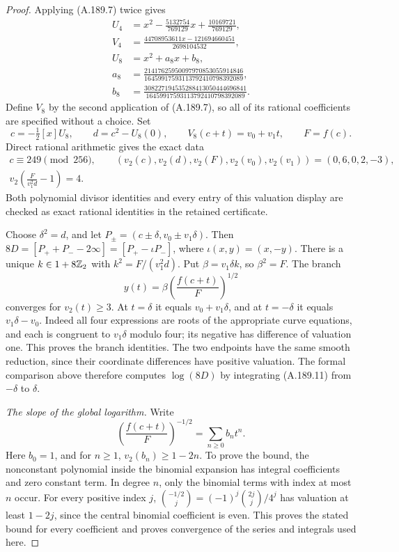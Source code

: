 \begin{proof}
Applying (A.189.7) twice gives
\[
\begin{aligned}
 U_4&=x^2-\frac{5132754}{769129}x
                         +\frac{10169721}{769129},\\
 V_4&=\frac{44708953611x-121694660451}{2698104532},\\
 U_8&=x^2+a_8x+b_8,\\
 a_8&=\frac{21417625950097970853055914846}{16459917593113792410798392089},\\
 b_8&=\frac{308227194535288413050444696841}{16459917593113792410798392089}.
\end{aligned}
\tag{A.189.8}
\]
Define \(V_8\) by the second application of
(A.189.7), so all of its rational coefficients are
specified without a choice.  Set
\[
 c=-\tfrac12[x]U_8,\qquad d=c^2-U_8(0),\qquad
 V_8(c+t)=v_0+v_1t,\qquad F=f(c).
\tag{A.189.9}
\]
Direct rational arithmetic gives the exact data
\[
\begin{gathered}
 c\equiv249\pmod{256},\qquad
 (v_2(c),v_2(d),v_2(F),v_2(v_0),v_2(v_1))
                         =(0,6,0,2,-3),\\
 v_2\!\left(\frac{F}{v_1^2d}-1\right)=4.
\end{gathered}
\tag{A.189.10}
\]
Both polynomial divisor identities and every entry of
this valuation display are checked as exact rational
identities in the retained certificate.

Choose \(\delta^2=d\), and let
\(P_\pm=(c\pm\delta,v_0\pm v_1\delta)\).
Then
\(8D=[P_++P_--2\infty]=[P_+-\iota P_-]\),
where \(\iota(x,y)=(x,-y)\).
There is a unique \(k\in1+8\mathbb Z_2\) with
\(k^2=F/(v_1^2d)\).  Put
\(\beta=v_1\delta k\), so \(\beta^2=F\).
The branch
\[
                  y(t)=\beta\left(\frac{f(c+t)}{F}\right)^{1/2}
\tag{A.189.11}
\]
converges for \(v_2(t)\geq3\).  At \(t=\delta\)
it equals \(v_0+v_1\delta\), and at \(t=-\delta\)
it equals \(v_1\delta-v_0\).  Indeed all four
expressions are roots of the appropriate curve
equations, and each is congruent to \(v_1\delta\)
modulo four; its negative has difference of valuation
one.  This proves the branch identities.  The two
endpoints have the same smooth reduction, since their
coordinate differences have positive valuation.
The formal comparison above therefore computes
\(\log(8D)\) by integrating (A.189.11) from
\(-\delta\) to \(\delta\).

\emph{The slope of the global logarithm.}
Write
\[
 \left(\frac{f(c+t)}{F}\right)^{-1/2}
                        =\sum_{n\geq0}b_nt^n.
\tag{A.189.12}
\]
Here \(b_0=1\), and for \(n\geq1\),
\(v_2(b_n)\geq1-2n\).
To prove the bound, the nonconstant polynomial inside
the binomial expansion has integral coefficients and
zero constant term.  In degree \(n\), only the
binomial terms with index at most \(n\) occur.
For every positive index \(j\),
\(\binom{-1/2}{j}=(-1)^j\binom{2j}{j}/4^j\)
has valuation at least \(1-2j\), since the central
binomial coefficient is even.  This proves the stated
bound for every coefficient and proves convergence
of the series and integrals used here.


\end{proof}
